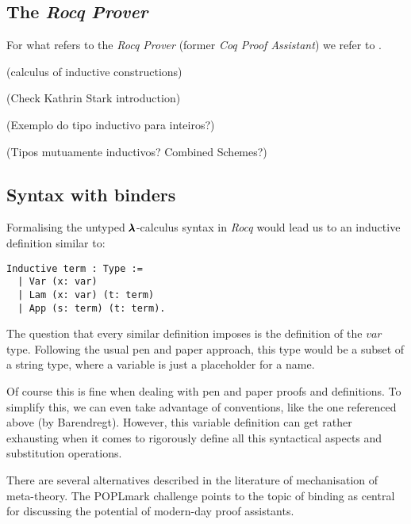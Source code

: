 \subsection{The \textit{Rocq Prover}}

For what refers to the \textit{Rocq Prover} (former \textit{Coq Proof Assistant}) we refer to \cite{CoqArt}.

(calculus of inductive constructions)

(Check Kathrin Stark introduction)

(Exemplo do tipo inductivo para inteiros?)

(Tipos mutuamente inductivos? Combined Schemes?)

\subsection{Syntax with binders}

Formalising the untyped $\pmb{\lambda}$-calculus syntax in \textit{Rocq} would lead us to an inductive definition similar to:

\begin{lstlisting}[language=Coq]
  Inductive term : Type :=
  | Var (x: var)
  | Lam (x: var) (t: term)
  | App (s: term) (t: term).
\end{lstlisting}

The question that every similar definition imposes is the definition of the $var$ type. Following the usual pen and paper approach, this type would be a subset of a string type, where a variable is just a placeholder for a name.

Of course this is fine when dealing with pen and paper proofs and definitions. To simplify this, we can even take advantage of conventions, like the one referenced above (by Barendregt). 
However, this variable definition can get rather exhausting  when it comes to rigorously define all this syntactical aspects and substitution operations.

There are several alternatives described in the literature of mechanisation of meta-theory. 
The POPLmark challenge \cite{POPLmark} points to the topic of binding as central for discussing the potential of modern-day proof assistants.

